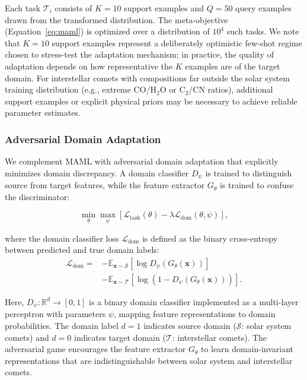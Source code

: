 \documentclass[preprint2]{aastex631}
\begin{document}
Each task $\mathcal{T}_i$ consists of $K=10$ support examples and $Q=50$ query examples drawn from the transformed distribution. The meta-objective (Equation~\ref{eq:maml}) is optimized over a distribution of $10^4$ such tasks. We note that $K=10$ support examples represent a deliberately optimistic few-shot regime chosen to stress-test the adaptation mechanism; in practice, the quality of adaptation depends on how representative the $K$ examples are of the target domain. For interstellar comets with compositions far outside the solar system training distribution (e.g., extreme CO/H$_2$O or C$_2$/CN ratios), additional support examples or explicit physical priors may be necessary to achieve reliable parameter estimates.

\subsubsection{Adversarial Domain Adaptation}

We complement MAML with adversarial domain adaptation \citep{ganin16} that explicitly minimizes domain discrepancy. A domain classifier $D_\psi$ is trained to distinguish source from target features, while the feature extractor $G_\theta$ is trained to confuse the discriminator:

\begin{equation}\label{eq:adv_loss}
\min_\theta \max_\psi \left[ \mathcal{L}_{\text{task}}(\theta) - \lambda \mathcal{L}_{\text{dom}}(\theta, \psi) \right],
\end{equation}

where the domain classifier loss $\mathcal{L}_{\text{dom}}$ is defined as the binary cross-entropy between predicted and true domain labels:
\begin{equation}\label{eq:dom_loss}
\begin{split}
\mathcal{L}_{\text{dom}} ={} &
    -\mathbb{E}_{\mathbf{x} \sim \mathcal{S}}[\log D_\psi(G_\theta(\mathbf{x}))] \\
    &-\mathbb{E}_{\mathbf{x} \sim \mathcal{T}}[\log(1 - D_\psi(G_\theta(\mathbf{x})))].
\end{split}
\end{equation}

Here, $D_\psi: \mathbb{R}^d \rightarrow [0,1]$ is a binary domain classifier implemented as a multi-layer perceptron with parameters $\psi$, mapping feature representations to domain probabilities. The domain label $d=1$ indicates source domain ($\mathcal{S}$: solar system comets) and $d=0$ indicates target domain ($\mathcal{T}$: interstellar comets). The adversarial game encourages the feature extractor $G_\theta$ to learn domain-invariant representations that are indistinguishable between solar system and interstellar comets.
\end{document}
